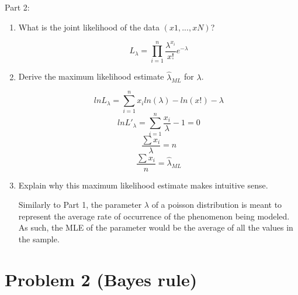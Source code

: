 \documentclass[11pt]{article}
\begin{document}
Part 2:
\begin{enumerate}
\item What is the joint likelihood of the data $(x1,...,xN)$?

\[
L_{\lambda} = \prod_{i=1}^{n} \frac{\lambda^{x_i}}{x!} e^{-\lambda}
\]

\item Derive the maximum likelihood estimate $\hat \lambda_{ML}$ for $\lambda$.

\[
ln L_{\lambda} = \sum_{i=1}^{n} x_i ln(\lambda) - ln(x!) - \lambda
\]
\[
ln L\prime_{\lambda} = \sum_{i=1}^{n} \frac{x_i}{\lambda} - 1 = 0
\]
\[
\frac{\sum x_i}{\lambda} = n
\]
\[
\frac{\sum x_i}{n} = \hat \lambda_{ML}
\]

\item Explain why this maximum likelihood estimate makes intuitive sense.

Similarly to Part 1, the parameter $\lambda$ of a poisson distribution is meant to represent the average rate of occurrence of the phenomenon being modeled. As such, the MLE of the parameter would be the average of all the values in the sample.

\end{enumerate}



\section*{Problem 2 (Bayes rule)}
\end{document}
